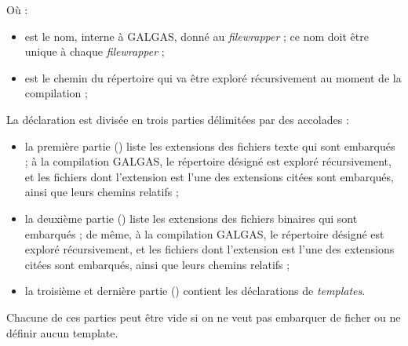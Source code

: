 Où :
\begin{itemize}
  \item {} est le nom, interne à GALGAS, donné au \emph{filewrapper} ; ce nom doit être unique à chaque \emph{filewrapper} ;
  \item {} est le chemin du répertoire qui va être exploré récursivement au moment de la compilation ;
\end{itemize}

La déclaration est divisée en trois parties délimitées par des accolades  :
\begin{itemize}
  \item la première partie () liste les extensions des fichiers texte qui sont embarqués ; à la compilation GALGAS, le répertoire désigné est exploré récursivement, et les fichiers dont l'extension est l'une des extensions citées sont embarqués, ainsi que leurs chemins relatifs ;
  \item la deuxième partie () liste les extensions des fichiers binaires qui sont embarqués ; de même, à la compilation GALGAS, le répertoire désigné est exploré récursivement, et les fichiers dont l'extension est l'une des extensions citées sont embarqués, ainsi que leurs chemins relatifs ;
  \item la troisième et dernière partie () contient les déclarations de \emph{templates}.
\end{itemize}

Chacune de ces parties peut être vide si on ne veut pas embarquer de ficher ou ne définir aucun template.


